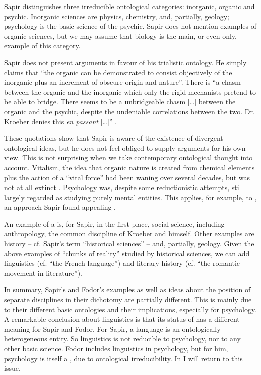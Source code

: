 \documentclass[output=paper]{langscibook}
\begin{document}
Sapir distinguishes three irreducible ontological categories: inorganic, organic and psychic. Inorganic sciences are physics, chemistry, and, partially, geology; psychology is the basic science of the psychic. Sapir does not mention examples of organic sciences, but we may assume that biology is the main, or even only, example of this category.

Sapir does not present arguments in favour of his trialistic ontology. He simply claims that ``the organic can be demonstrated to consist objectively of the inorganic plus an increment of obscure origin and nature''. There is ``a chasm between the organic and the inorganic which only the rigid mechanists pretend to be able to bridge. There seems to be a unbridgeable chasm […] between the organic and the psychic, despite the undeniable correlations between the two. Dr. Kroeber denies this \emph{en passant} […]'' \citep[444]{Sapir1917}.

These quotations show that Sapir is aware of the existence of divergent ontological ideas, but he does not feel obliged to supply arguments for his own view. This is not surprising when we take contemporary ontological thought into account. Vitalism, the idea that organic nature is created from chemical elements plus the action of a ``vital force'' had been waning over several decades, but was not at all extinct \citep[cf.][]{Beckner1967}. Psychology was, despite some reductionistic attempts, still largely regarded as studying purely mental entities. This applies, for example, to , an approach Sapir found appealing \citep[cf.][xvi]{Sapir2002}.

An example of a  is, for Sapir, in the first place, social science, including anthropology, the common discipline of Kroeber and himself. Other examples are history -- cf. Sapir's term ``historical sciences'' -- and, partially, geology. Given the above examples of ``chunks of reality'' studied by historical sciences, we can add linguistics (cf. ``the French language'') and literary history (cf. ``the romantic movement in literature'').

In summary, Sapir's and Fodor's examples as well as ideas about the position of separate disciplines in their dichotomy are partially different. This is mainly due to their different basic ontologies and their implications, especially for psychology. A remarkable conclusion about linguistics is that its status of  has a different meaning for Sapir and Fodor. For Sapir, a language is an ontologically heterogeneous entity. So linguistics is not reducible to psychology, nor to any other basic science. Fodor includes linguistics in psychology, but for him, psychology is itself a , due to ontological irreducibility. In  I will return to this issue.
\end{document}

